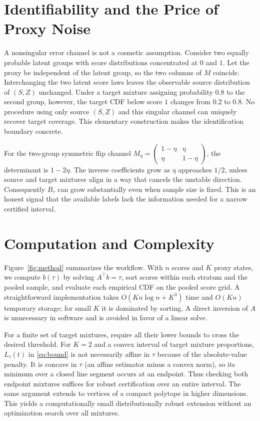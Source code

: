 \documentclass[twoside,11pt]{article}
\begin{document}
\section{Identifiability and the Price of Proxy Noise}
A nonsingular error channel is not a cosmetic assumption. Consider two equally probable latent groups with score distributions concentrated at $0$ and $1$. Let the proxy be independent of the latent group, so the two columns of $M$ coincide. Interchanging the two latent score laws leaves the observable source distribution of $(S,Z)$ unchanged. Under a target mixture assigning probability $0.8$ to the second group, however, the target CDF below score $1$ changes from $0.2$ to $0.8$. No procedure using only source $(S,Z)$ and this singular channel can uniquely recover target coverage. This elementary construction makes the identification boundary concrete.

For the two-group symmetric flip channel $M_\eta=\left(\begin{smallmatrix}1-\eta&\eta\\\eta&1-\eta\end{smallmatrix}\right)$, the determinant is $1-2\eta$. The inverse coefficients grow as $\eta$ approaches $1/2$, unless source and target mixtures align in a way that cancels the unstable direction. Consequently $B_\tau$ can grow substantially even when sample size is fixed. This is an honest signal that the available labels lack the information needed for a narrow certified interval.

\section{Computation and Complexity}
Figure~\ref{fig:method} summarizes the workflow. With $n$ scores and $K$ proxy states, we compute $b(\tau)$ by solving $A^\top b=\tau$, sort scores within each stratum and the pooled sample, and evaluate each empirical CDF on the pooled score grid. A straightforward implementation takes $O(Kn\log n+K^3)$ time and $O(Kn)$ temporary storage; for small $K$ it is dominated by sorting. A direct inversion of $A$ is unnecessary in software and is avoided in favor of a linear solve.

For a finite set of target mixtures, require all their lower bounds to cross the desired threshold. For $K=2$ and a convex interval of target mixture proportions, $L_\tau(t)$ in \eqref{eq:bound} is not necessarily affine in $\tau$ because of the absolute-value penalty. It is concave in $\tau$ (an affine estimator minus a convex norm), so its minimum over a closed line segment occurs at an endpoint. Thus checking both endpoint mixtures suffices for robust certification over an entire interval. The same argument extends to vertices of a compact polytope in higher dimensions. This yields a computationally small distributionally robust extension without an optimization search over all mixtures.
\end{document}
